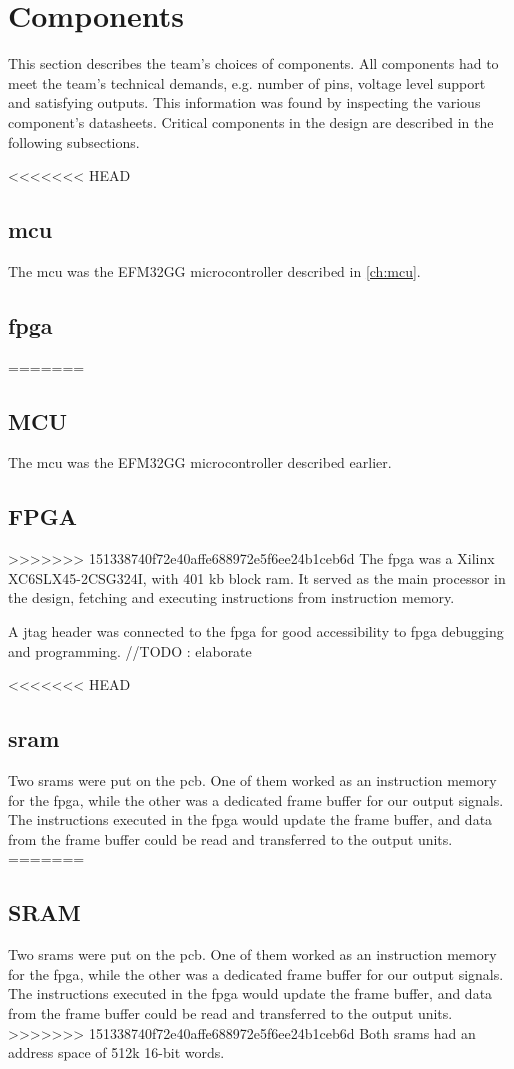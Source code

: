 \section{Components}
This section describes the team's choices of components.
All components had to meet the team's technical demands, e.g. number of pins, voltage level support and satisfying outputs.
This information was found by inspecting the various component's datasheets.
Critical components in the design are described in the following subsections.

<<<<<<< HEAD
\subsection{\gls{mcu}}
The \gls{mcu} was the EFM32GG microcontroller described in \ref{ch:mcu}.

\subsection{\gls{fpga}}
=======
\subsection{MCU}
The \gls{mcu} was the EFM32GG microcontroller described earlier.

\subsection{FPGA}
>>>>>>> 151338740f72e40affe688972e5f6ee24b1ceb6d
The \gls{fpga} was a Xilinx XC6SLX45-2CSG324I, with 401 kb block \gls{ram}.
It served as the main processor in the design, fetching and executing instructions from instruction memory.

A \gls{jtag} header was connected to the \gls{fpga} for good accessibility to \gls{fpga} debugging and programming.
//TODO : elaborate

<<<<<<< HEAD
\subsection{\gls{sram}}
Two \gls{sram}s were put on the \gls{pcb}. 
One of them worked as an instruction memory for the \gls{fpga}, while the other was a dedicated frame buffer for our output signals. 
The instructions executed in the \gls{fpga} would update the frame buffer, and data from the frame buffer could be read and transferred to the output units. 
=======
\subsection{SRAM}
Two \gls{sram}s were put on the \gls{pcb}.
One of them worked as an instruction memory for the \gls{fpga}, while the other was a dedicated frame buffer for our output signals.
The instructions executed in the \gls{fpga} would update the frame buffer, and data from the frame buffer could be read and transferred to the output units.
>>>>>>> 151338740f72e40affe688972e5f6ee24b1ceb6d
Both \gls{sram}s had an address space of 512k 16-bit words.

